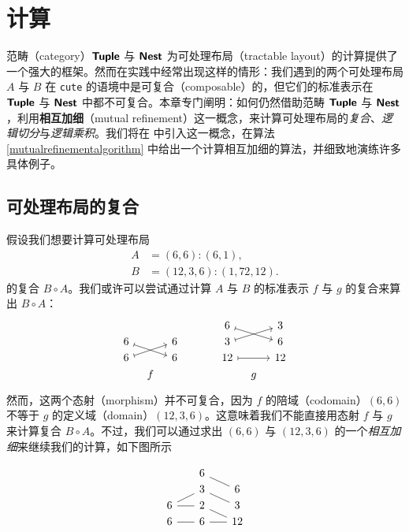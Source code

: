 \chapter{计算}\label{computationschapter}

范畴（category）${\boldsymbol{\mathsf{Tuple}}}$ 与 ${\boldsymbol{\mathsf{Nest}}}$ 为可处理布局（tractable layout）的计算提供了一个强大的框架。然而在实践中经常出现这样的情形：我们遇到的两个可处理布局 $A$ 与 $B$ 在 \verb|cute| 的语境中是可复合（composable）的，但它们的标准表示在 ${\boldsymbol{\mathsf{Tuple}}}$ 与 ${\boldsymbol{\mathsf{Nest}}}$ 中都不可复合。本章专门阐明：如何仍然借助范畴 ${\boldsymbol{\mathsf{Tuple}}}$ 与 ${\boldsymbol{\mathsf{Nest}}}$，利用{\bf 相互加细}（mutual refinement）这一概念，来计算可处理布局的{\it 复合}、{\it 逻辑切分}与{\it 逻辑乘积}。我们将在  中引入这一概念，在算法 \ref{mutualrefinementalgorithm} 中给出一个计算相互加细的算法，并细致地演练许多具体例子。


\section{可处理布局的复合}
假设我们想要计算可处理布局
\begin{align*}
    A & = (6,6):(6,1),\\
    B & = (12,3,6):(1,72,12).
\end{align*}
的复合 $B \circ A$。我们或许可以尝试通过计算 $A$ 与 $B$ 的标准表示 $f$ 与 $g$ 的复合来算出 $B \circ A$：
\[ \begin{tikzcd} [row sep = 1, column sep = 8]
         & & & & & & 6 \ar[drr,mapsto] & & 3\\
        6 \ar[drr,mapsto] & & 6 & & & & 3 \ar[urr,mapsto] & & 6\\
        6 \ar[urr,mapsto] & & 6 & & & & 12 \ar[rr,mapsto] & & 12\\
        & f & & & & & & g & \\
        \end{tikzcd} \]
然而，这两个态射（morphism）并不可复合，因为 $f$ 的陪域（codomain）$(6,6)$ 不等于 $g$ 的定义域（domain）$(12,3,6)$。这意味着我们不能直接用态射 $f$ 与 $g$ 来计算复合 $B \circ A$。不过，我们可以通过求出 $(6,6)$ 与 $(12,3,6)$ 的一个{\it 相互加细}来继续我们的计算，如下图所示

        \[ \begin{tikzcd} [row sep = 1, column sep = 8]
           & & 6 \ar[-,drr] & &  \\
          & & 3 \ar[-,drr] & & 6 \\
         6  \ar[-,urr] \ar[-,rr]  & & 2 \ar[-,drr] & & 3 \\
        6 \ar[rr,-] & & 6 \ar[-,swap,rr] & & 12 \\
           &  & &  &  \\
        \end{tikzcd} \]

